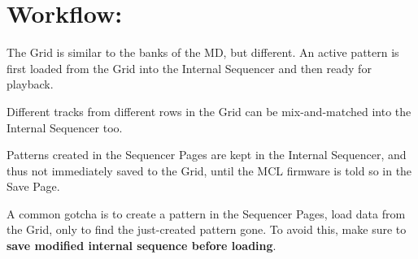 \chapter{ Workflow: }

The Grid is similar to the banks of the MD, but different. An active pattern is first loaded from the Grid into the Internal Sequencer and then ready for playback. 

Different tracks from different rows in the Grid can be mix-and-matched into the Internal Sequencer too.

Patterns created in the Sequencer Pages are kept in the Internal Sequencer, and thus not immediately saved to the Grid, until the MCL firmware is told so in the Save Page. 

A common gotcha is to create a pattern in the Sequencer Pages, load data from the Grid, only to find the just-created pattern gone. To avoid this, make sure to \textbf{save modified internal sequence before loading}.
